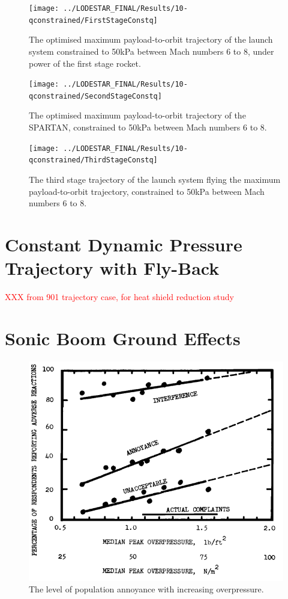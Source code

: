 \begin{figure}[th]
\centering
\texttt{[image: ../LODESTAR\_FINAL/Results/10-qconstrained/FirstStageConstq]}
\caption{The optimised maximum payload-to-orbit trajectory of the launch system constrained to 50kPa between Mach numbers 6 to 8, under power of the first stage rocket.}
\label{fig:FirstStageqConstrained68}
\end{figure}
		
\begin{figure}[th]
\centering
\texttt{[image: ../LODESTAR\_FINAL/Results/10-qconstrained/SecondStageConstq]}
\caption{The optimised maximum payload-to-orbit trajectory of the SPARTAN, constrained to 50kPa between Mach numbers 6 to 8.}
\label{fig:SecondStageqConstrained68}
\end{figure}

\begin{figure}[th]
\centering
\texttt{[image: ../LODESTAR\_FINAL/Results/10-qconstrained/ThirdStageConstq]}
\caption{The third stage trajectory of the launch system flying the maximum payload-to-orbit trajectory, constrained to 50kPa between Mach numbers 6 to 8.}
\label{fig:ThirdStageqConstrained68}
\end{figure}






\section{Constant Dynamic Pressure Trajectory with Fly-Back}
\textcolor{red}{XXX from 901 trajectory case, for heat shield reduction study}


\section{Sonic Boom Ground Effects}
\begin{figure}[ht]
	\centering
	\includegraphics[width=0.6\linewidth]{figures/6_FlyBack/OverPressureResponse}
	\caption{The level of population annoyance with increasing overpressure.}
	\label{fig:OverPressureResponse}
\end{figure}

